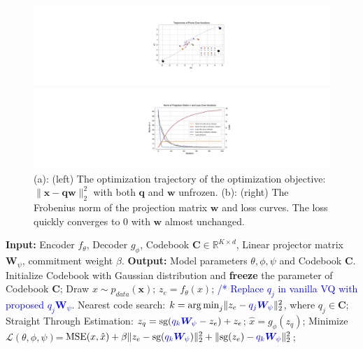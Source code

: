 \begin{figure}[t]
    \centering
    \begin{minipage}[b]{0.47\columnwidth}
        \centering
        \includegraphics[width=\columnwidth]{material/dynamic1.pdf}
    \end{minipage}
    \begin{minipage}[b]{0.51\columnwidth}
        \centering
        \includegraphics[width=\columnwidth]{material/dynamic11.pdf}
    \end{minipage}
    \caption{(a): (left) The optimization trajectory of the optimization objective: $\|\bm{x}-\bm{q}\bm{w}\|^2_2$ with both $\bm{q}$ and $\bm{w}$ unfrozen. (b): (right) The Frobenius norm of the projection matrix $\bm{w}$ and loss curves. The loss quickly converges to 0 with $\bm{w}$ almost unchanged.}
    \label{fig:optim2}
\end{figure}


\begin{algorithm}[t]
   \caption{Training Procedure %
   for SimVQ}
   \label{alg:code}
\begin{algorithmic}
\STATE \textbf{Input:} Encoder $f_{\theta}$, Decoder $g_{\phi}$, Codebook $\bm{C}\in \mathbb{R}^{K\times d}$, Linear projector matrix $\bm{W}_{\psi}$, commitment weight $\beta$. 
\STATE \textbf{Output:} Model parameters $\theta, \phi, \psi$ and Codebook $\bm{C}$.
\STATE Initialize Codebook with Gaussian distribution and \textbf{freeze} the parameter of Codebook $\bm{C}$;
\REPEAT
    \STATE Draw $x\sim p_{data}(\bm{x})$;
    \STATE $z_e=f_{\theta}(x)$;
    \STATE \textcolor{blue}{/* Replace $q_j$ in vanilla VQ with proposed $q_j\bm{W}_{\psi}$.}
    \STATE Nearest code search: $k = {\arg\min}_{j} \|z_e - \textcolor{blue}{q_j\bm{W}_{\psi}}\|^2_2$, where $q_j\in \bm{C}$; %
    \STATE Straight Through Estimation: $z_q=\text{sg}(\textcolor{blue}{q_k\bm{W}_{\psi}} - z_e)+z_e$;
    \STATE $\hat{x}=g_{\phi}(z_q)$;
    \STATE Minimize $\mathcal{L}(\theta,\phi,\psi)$=$\text{MSE}(x,\hat{x})+\beta \|z_e-\text{sg}(\textcolor{blue}{q_k\bm{W}_{\psi}})\|^2_2+\|\text{sg}(z_e)-\textcolor{blue}{q_k\bm{W}_{\psi}}\|^2_2$;
\end{algorithmic}
\end{algorithm}


